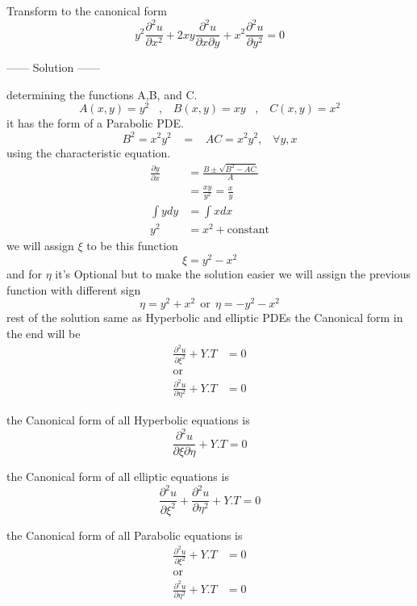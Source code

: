 \documentclass[]{article}
\begin{document}
\begin{example}
    Transform to the canonical form
    \[
        y^2\frac{\partial^2 u}{\partial x^2}+2xy\frac{\partial^2 u}{\partial x\partial y}+x^2\frac{\partial^2 u}{\partial y^2} = 0  
    \]
    \begin{center}
        ------ \textcolor{Solution}{Solution} ------ 
    \end{center}
    determining the functions A,B, and C.
    \[
        A\left(x,y\right)=y^2 \;\;\;,\;\;\; B\left(x,y\right)=xy \;\;\;,\;\;\; C\left(x,y\right)=x^2    
    \]
    it has the form of a Parabolic PDE.
    \[
        B^2 =x^2 y^2 \;\;\;=\;\;\; AC=x^2 y^2, \;\;\;\forall y, x  
    \]
    using the characteristic equation.
    \begin{align*}
        \frac{\partial y}{\partial x} &= \frac{B\pm\sqrt{B^2 -AC}}{A}
        \\
        &= \frac{xy}{y^2}=\frac{x}{y}
        \\
        \int y dy &= \int x dx 
        \\
        y^2 &= x^2 +\text{constant}
    \end{align*}
    we will assign $\xi$ to be this function
    \[
        \xi = y^2 - x^2
    \]
    and for $\eta$ it's Optional but to make the solution easier we will assign the previous function with different sign  
    \[
        \eta = y^2 + x^2 \ \ \text{or} \ \ \eta = - y^2 - x^2
    \]
    rest of the solution same as Hyperbolic and elliptic PDEs
    the Canonical form in the end will be 
    \begin{align*}
        \frac{\partial^2 u}{\partial\xi^2}+Y.T &=0
        \\
        \text{or}
        \\
        \frac{\partial^2 u}{\partial\eta^2}+Y.T &=0
    \end{align*}
\end{example}

\begin{observation}
    the Canonical form of all Hyperbolic equations is 
    \[
        \frac{\partial^2 u}{\partial\xi\partial\eta} +Y.T = 0
    \]
\end{observation}
\begin{observation}
    the Canonical form of all elliptic equations is 
    \[
        \frac{\partial^2 u}{\partial\xi^2}+\frac{\partial^2 u}{\partial\eta^2}+Y.T =0
    \]
\end{observation}
\begin{observation}
    the Canonical form of all Parabolic equations is 
    \begin{align*}
        \frac{\partial^2 u}{\partial\xi^2}+Y.T &=0
        \\
        \text{or}
        \\
        \frac{\partial^2 u}{\partial\eta^2}+Y.T &=0
    \end{align*}
\end{observation}
\end{document}
